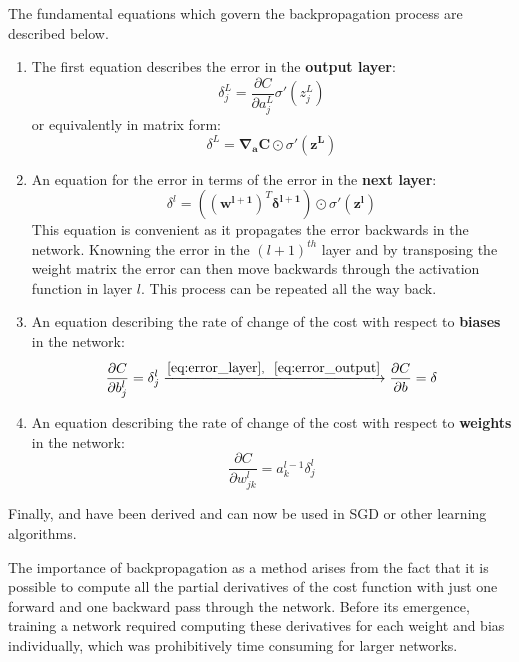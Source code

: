 The fundamental equations which govern the backpropagation process
are described below.
\begin{enumerate}
\item
  The first equation describes the error in the
  \textbf{output layer}:
  \begin{equation}
    \delta^L_j = \frac{\partial C}{\partial a_j^L} \sigma'(z_j^L)
  \end{equation}
  or equivalently in matrix form:
  \begin{equation}
    \label{eq:error_output}
    \delta^L = \bm{\nabla_a C} \odot \sigma' (\bm{z^L})
  \end{equation}
\item
  An equation for the error in terms of the error in the
  \textbf{next layer}:
  \begin{equation}
    \label{eq:error_layer}
    \delta^l = ((\bm{w^{l+1}})^T\bm{\delta^{l+1}})\odot \sigma'(\bm{z^l})
  \end{equation}
  This equation is convenient as it propagates the error backwards
  in the network. Knowning the error in the $(l+1)^{th}$ layer and
  by transposing the weight matrix the error can then move backwards
  through the activation function in layer $l$. This process can be
  repeated all the way back.
\item
  An equation describing the rate of change of the cost with respect to \textbf{biases}
  in the network:
  \begin{equation}
    \label{eq:error_bias}
    \frac{\partial C}{\partial b_j^l} = \delta^l_j \xrightarrow{\ref{eq:error_layer},~~ \ref{eq:error_output}} \frac{\partial C}{\partial b} = \delta 
  \end{equation}
\item
  An equation describing the rate of change of the cost with respect
  to \textbf{weights} in the network:
  \begin{equation}
    \label{eq:error_cost}
    \frac{\partial C}{\partial w_{jk}^l} = a^{l-1}_k\delta^l_j
  \end{equation}
  
\end{enumerate}

Finally,  and  have been
derived and can now be used in SGD or other learning algorithms.

The importance of backpropagation as a method arises from the fact that it is
possible to compute all the partial derivatives of the cost function
with just one forward and one backward pass through the network. Before
its emergence, training a network required computing these derivatives
for each weight and bias individually, which was prohibitively time consuming
for larger networks.



